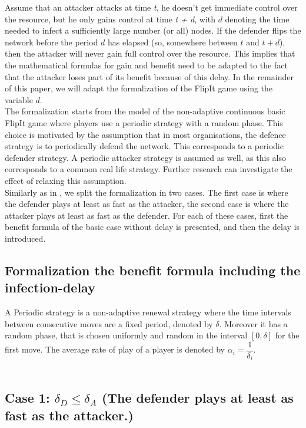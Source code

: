 \documentclass[journal,a4paper]{IEEEtran}
\begin{document}
Assume that an attacker attacks at time \textit{t}, he doesn't get immediate control over the resource, but he only gains control at time \textit{t + d}, with $d$ denoting the time needed to infect a sufficiently large number (or all) nodes. If the defender flips the network before the period $d$ has elapsed (so, somewhere between $t$ and $t + d$), then the attacker will never gain full control over the resource. This implies that the mathematical formulas for gain and benefit need to be adapted to the fact that the attacker loses part of its benefit because of this delay. In the remainder of this paper, we will adapt the formalization of the FlipIt game using the variable $d$. \\

The formalization starts from the model of the non-adaptive continuous basic FlipIt game where players use a periodic strategy with a random phase. This choice is motivated by the assumption that in most organisations, the defence strategy is to periodically defend the network. This corresponds to a periodic defender strategy.  A periodic attacker strategy is assumed as well, as this also corresponds to a common real life strategy. %
Further research can investigate the effect of relaxing this assumption. \\

Similarly as in \cite{FlipIt}, we split the formalization in two cases. The first case is where the defender plays at least as fast as the attacker, the second case is where the attacker plays at least as fast as the defender. For each of these cases, first the benefit formula of the basic case without delay is presented, and then the delay is introduced.  \\

\subsection{Formalization the benefit formula including the infection-delay}
 A Periodic strategy is a non-adaptive renewal strategy where the time intervals between consecutive moves are a fixed period, denoted by $\delta$. Moreover it has a random phase, that is chosen uniformly and random in the interval $[0,\delta]$ for the first move. The average rate of play of a player is denoted by $\alpha_{i} = \dfrac{1}{\delta_{i}}$. \\
~~\\

\subsection*{\textbf{Case 1:} $\delta_{D} \leq \delta_{A} $ (The defender plays at least as fast as the attacker.) }
\end{document}
